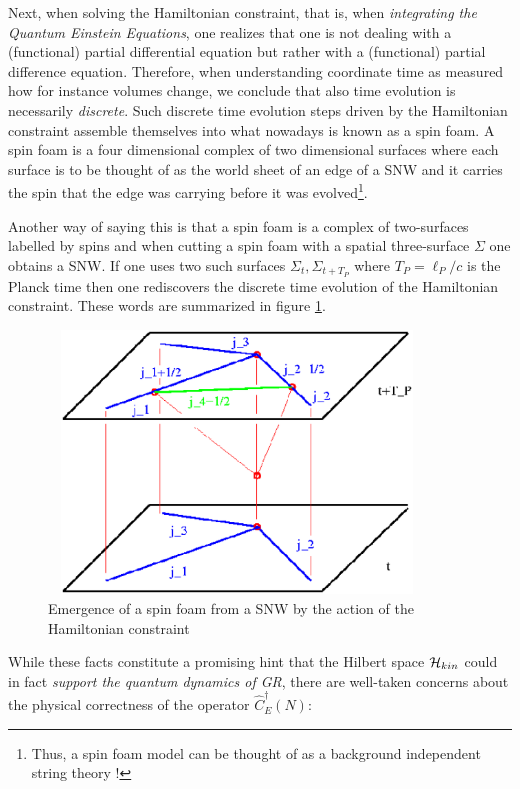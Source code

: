 \documentclass[12pt]{report}
\begin{document}
\begin{itemize}
Next, when solving the Hamiltonian constraint, that is, when {\it integrating
the Quantum Einstein Equations}, one realizes that one is not dealing 
with a (functional) partial differential equation but rather with 
a (functional) partial difference equation. Therefore, when understanding 
coordinate time as measured how for instance volumes change, we conclude 
that also time evolution is necessarily {\it discrete}. Such discrete 
time evolution steps driven by the Hamiltonian constraint assemble 
themselves into what nowadays is known as a spin foam. A spin foam is a 
four dimensional complex of two dimensional surfaces where each surface is 
to be thought of as the world sheet of an edge of a SNW and it carries 
the spin that the edge was carrying before it was evolved\footnote{Thus, a 
spin foam model can be thought of as a background independent string theory !}.

Another way of saying this is that a spin foam is a complex of 
two-surfaces labelled by spins and when cutting a spin foam with a 
spatial three-surface $\Sigma$ one obtains a SNW. If one uses two such 
surfaces $\Sigma_t,\Sigma_{t+T_P}$ where $T_P=\ell_P/c$ is the Planck time
then one rediscovers the discrete time evolution of the Hamiltonian 
constraint. These words are summarized in figure \ref{f11}. 
%
\end{itemize}
%
\begin{figure}
\includegraphics[width=10cm,height=7cm]{proc9fig11.ps}
\caption{Emergence of a spin foam from a SNW by the action of the 
Hamiltonian constraint} 
\label{f11}
\end{figure}
%
While these facts constitute a promising hint that the Hilbert space 
${\cal H}_{kin}$ could in fact {\it support the quantum dynamics of GR}, 
there are well-taken concerns 
about the physical correctness of the operator $\hat{C}_E^\dagger(N)$:\\ 
\end{document}

